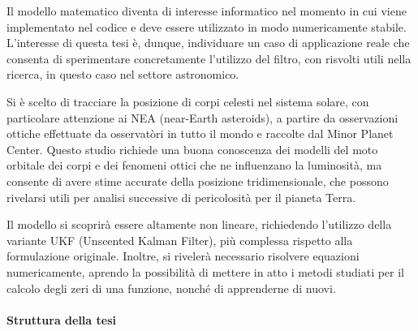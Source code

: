 \documentclass[12pt,a4paper,openright,twoside]{book}
\begin{document}
Il modello matematico diventa di interesse informatico nel momento in cui viene implementato nel codice e deve essere utilizzato in modo numericamente stabile. L'interesse di questa tesi è, dunque, individuare un caso di applicazione reale che consenta di sperimentare concretamente l'utilizzo del filtro, con risvolti utili nella ricerca, in questo caso nel settore astronomico.

Si è scelto di tracciare la posizione di corpi celesti nel sistema solare, con particolare attenzione ai NEA (near-Earth asteroids), a partire da osservazioni ottiche effettuate da osservatòri in tutto il mondo e raccolte dal Minor Planet Center. Questo studio richiede una buona conoscenza dei modelli del moto orbitale dei corpi e dei fenomeni ottici che ne influenzano la luminosità, ma consente di avere stime accurate della posizione tridimensionale, che possono rivelarsi utili per analisi successive di pericolosità per il pianeta Terra.

Il modello si scoprirà essere altamente non lineare, richiedendo l'utilizzo della variante UKF (Unscented Kalman Filter), più complessa rispetto alla formulazione originale. Inoltre, si rivelerà necessario risolvere equazioni numericamente, aprendo la possibilità di mettere in atto i metodi studiati per il calcolo degli zeri di una funzione, nonché di apprenderne di nuovi.

\paragraph{Struttura della tesi}
\end{document}
